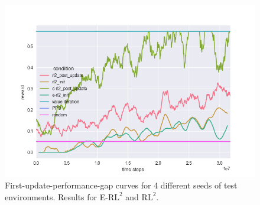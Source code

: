 \documentclass{article} %
\begin{document}
\begin{figure}[H]
\begin{center}
\includegraphics[scale=0.16]{bradly_curves/gap_grids_rl2_3.png}
\end{center}
\caption{First-update-performance-gap curves for 4 different seeds of test environments. Results for E-$\text{RL}^2$ and $\text{RL}^2$.}
\label{fig:appendix-gap-curves-1}
\end{figure} 


\end{document}
